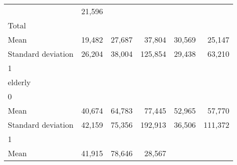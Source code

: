 \begin{tabular}{llllll}
  \multicolumn{1}{r}{} &
  \multicolumn{1}{r}{21,596} \\
\multicolumn{1}{l}{\hspace{3em}Total} &
  \multicolumn{1}{|r}{} &
  \multicolumn{1}{r}{} &
  \multicolumn{1}{r}{} &
  \multicolumn{1}{r}{} &
  \multicolumn{1}{r}{} \\
\multicolumn{1}{l}{\hspace{4em}Mean} &
  \multicolumn{1}{|r}{19,482} &
  \multicolumn{1}{r}{27,687} &
  \multicolumn{1}{r}{37,804} &
  \multicolumn{1}{r}{30,569} &
  \multicolumn{1}{r}{25,147} \\
\multicolumn{1}{l}{\hspace{4em}Standard deviation} &
  \multicolumn{1}{|r}{26,204} &
  \multicolumn{1}{r}{38,004} &
  \multicolumn{1}{r}{125,854} &
  \multicolumn{1}{r}{29,438} &
  \multicolumn{1}{r}{63,210} \\
\multicolumn{1}{l}{\hspace{1em}1} &
  \multicolumn{1}{|r}{} &
  \multicolumn{1}{r}{} &
  \multicolumn{1}{r}{} &
  \multicolumn{1}{r}{} &
  \multicolumn{1}{r}{} \\
\multicolumn{1}{l}{\hspace{2em}elderly} &
  \multicolumn{1}{|r}{} &
  \multicolumn{1}{r}{} &
  \multicolumn{1}{r}{} &
  \multicolumn{1}{r}{} &
  \multicolumn{1}{r}{} \\
\multicolumn{1}{l}{\hspace{3em}0} &
  \multicolumn{1}{|r}{} &
  \multicolumn{1}{r}{} &
  \multicolumn{1}{r}{} &
  \multicolumn{1}{r}{} &
  \multicolumn{1}{r}{} \\
\multicolumn{1}{l}{\hspace{4em}Mean} &
  \multicolumn{1}{|r}{40,674} &
  \multicolumn{1}{r}{64,783} &
  \multicolumn{1}{r}{77,445} &
  \multicolumn{1}{r}{52,965} &
  \multicolumn{1}{r}{57,770} \\
\multicolumn{1}{l}{\hspace{4em}Standard deviation} &
  \multicolumn{1}{|r}{42,159} &
  \multicolumn{1}{r}{75,356} &
  \multicolumn{1}{r}{192,913} &
  \multicolumn{1}{r}{36,506} &
  \multicolumn{1}{r}{111,372} \\
\multicolumn{1}{l}{\hspace{3em}1} &
  \multicolumn{1}{|r}{} &
  \multicolumn{1}{r}{} &
  \multicolumn{1}{r}{} &
  \multicolumn{1}{r}{} &
  \multicolumn{1}{r}{} \\
\multicolumn{1}{l}{\hspace{4em}Mean} &
  \multicolumn{1}{|r}{41,915} &
  \multicolumn{1}{r}{78,646} &
  \multicolumn{1}{r}{28,567} &

\end{tabular}
